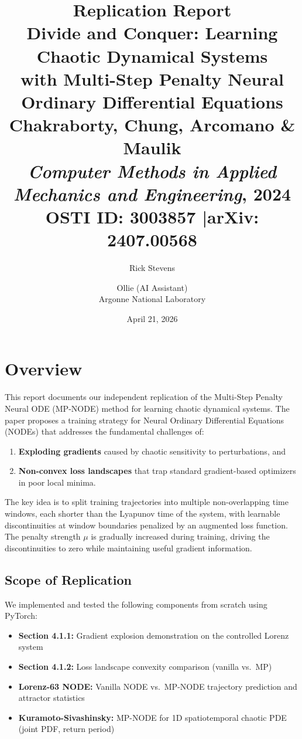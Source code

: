 \documentclass[11pt]{article}
\title{\textbf{Replication Report}\\[0.3em]
\large Divide and Conquer: Learning Chaotic Dynamical Systems\\
with Multi-Step Penalty Neural Ordinary Differential Equations\\[0.3em]
\normalsize Chakraborty, Chung, Arcomano \& Maulik\\
\normalsize \textit{Computer Methods in Applied Mechanics and Engineering}, 2024\\
\normalsize OSTI ID: 3003857 \quad|\quad arXiv: 2407.00568}
\author{Rick Stevens \and Ollie (AI Assistant)\\
Argonne National Laboratory}
\date{April 21, 2026}
\begin{document}
\maketitle
\thispagestyle{fancy}

\section{Overview}

This report documents our independent replication of the Multi-Step Penalty Neural ODE (MP-NODE) method for learning chaotic dynamical systems. The paper proposes a training strategy for Neural Ordinary Differential Equations (NODEs) that addresses the fundamental challenges of:
\begin{enumerate}[leftmargin=*]
    \item \textbf{Exploding gradients} caused by chaotic sensitivity to perturbations, and
    \item \textbf{Non-convex loss landscapes} that trap standard gradient-based optimizers in poor local minima.
\end{enumerate}

The key idea is to split training trajectories into multiple non-overlapping time windows, each shorter than the Lyapunov time of the system, with learnable discontinuities at window boundaries penalized by an augmented loss function. The penalty strength $\mu$ is gradually increased during training, driving the discontinuities to zero while maintaining useful gradient information.

\subsection{Scope of Replication}

We implemented and tested the following components from scratch using PyTorch:
\begin{itemize}[leftmargin=*]
    \item \textbf{Section 4.1.1:} Gradient explosion demonstration on the controlled Lorenz system
    \item \textbf{Section 4.1.2:} Loss landscape convexity comparison (vanilla vs.\ MP)
    \item \textbf{Lorenz-63 NODE:} Vanilla NODE vs.\ MP-NODE trajectory prediction and attractor statistics
    \item \textbf{Kuramoto-Sivashinsky:} MP-NODE for 1D spatiotemporal chaotic PDE (joint PDF, return period)
\end{itemize}
\end{document}

